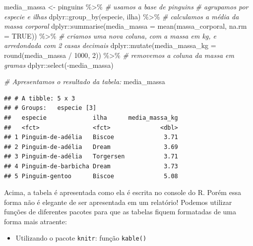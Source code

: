 \documentclass[
]{book}
\newenvironment{Shaded}{\begin{snugshade}}{\end{snugshade}}
\newcommand{\AttributeTok}[1]{\textcolor[rgb]{0.77,0.63,0.00}{#1}}
\newcommand{\CommentTok}[1]{\textcolor[rgb]{0.56,0.35,0.01}{\textit{#1}}}
\newcommand{\ConstantTok}[1]{\textcolor[rgb]{0.00,0.00,0.00}{#1}}
\newcommand{\DecValTok}[1]{\textcolor[rgb]{0.00,0.00,0.81}{#1}}
\newcommand{\FunctionTok}[1]{\textcolor[rgb]{0.00,0.00,0.00}{#1}}
\newcommand{\NormalTok}[1]{#1}
\newcommand{\OtherTok}[1]{\textcolor[rgb]{0.56,0.35,0.01}{#1}}
\newcommand{\SpecialCharTok}[1]{\textcolor[rgb]{0.00,0.00,0.00}{#1}}
\providecommand{\tightlist}{%
  \setlength{\itemsep}{0pt}\setlength{\parskip}{0pt}}
\begin{document}
\begin{Shaded}
\begin{Highlighting}[]
\NormalTok{media\_massa }\OtherTok{\textless{}{-}}\NormalTok{ pinguins }\SpecialCharTok{\%\textgreater{}\%} \CommentTok{\# usamos a base de pinguins}
  \CommentTok{\# agrupamos por especie e ilhas}
\NormalTok{  dplyr}\SpecialCharTok{::}\FunctionTok{group\_by}\NormalTok{(especie, ilha) }\SpecialCharTok{\%\textgreater{}\%}  
  \CommentTok{\# calculamos a média da massa corporal }
\NormalTok{  dplyr}\SpecialCharTok{::}\FunctionTok{summarise}\NormalTok{(}\AttributeTok{media\_massa =} \FunctionTok{mean}\NormalTok{(massa\_corporal, }\AttributeTok{na.rm =} \ConstantTok{TRUE}\NormalTok{)) }\SpecialCharTok{\%\textgreater{}\%} 
  \CommentTok{\# criamos uma nova coluna, com a massa em kg, e arredondada com 2 casas decimais}
\NormalTok{  dplyr}\SpecialCharTok{::}\FunctionTok{mutate}\NormalTok{(}\AttributeTok{media\_massa\_kg =} \FunctionTok{round}\NormalTok{(media\_massa }\SpecialCharTok{/} \DecValTok{1000}\NormalTok{, }\DecValTok{2}\NormalTok{)) }\SpecialCharTok{\%\textgreater{}\%}  
  \CommentTok{\# removemos a coluna da massa em gramas}
\NormalTok{  dplyr}\SpecialCharTok{::}\FunctionTok{select}\NormalTok{(}\SpecialCharTok{{-}}\NormalTok{media\_massa)}

\CommentTok{\# Apresentamos o resultado da tabela:}
\NormalTok{media\_massa}
\end{Highlighting}
\end{Shaded}

\begin{verbatim}
## # A tibble: 5 x 3
## # Groups:   especie [3]
##   especie             ilha      media_massa_kg
##   <fct>               <fct>              <dbl>
## 1 Pinguim-de-adélia   Biscoe              3.71
## 2 Pinguim-de-adélia   Dream               3.69
## 3 Pinguim-de-adélia   Torgersen           3.71
## 4 Pinguim-de-barbicha Dream               3.73
## 5 Pinguim-gentoo      Biscoe              5.08
\end{verbatim}

Acima, a tabela é apresentada como ela é escrita no console do R. Porém essa forma não é elegante de ser apresentada em um relatório! Podemos utilizar funções de diferentes pacotes para que as tabelas fiquem formatadas de uma forma mais atraente:

\begin{itemize}
\tightlist
\item
  Utilizando o pacote \texttt{knitr}: função \texttt{kable()}
\end{itemize}
\end{document}
